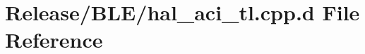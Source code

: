\hypertarget{_release_2_b_l_e_2hal__aci__tl_8cpp_8d}{\section{\-Release/\-B\-L\-E/hal\-\_\-aci\-\_\-tl.cpp.\-d \-File \-Reference}
\label{_release_2_b_l_e_2hal__aci__tl_8cpp_8d}
}
